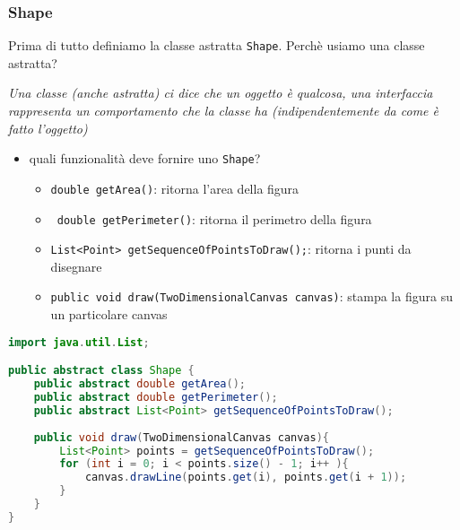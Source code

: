\documentclass{article}
\begin{document}
\subsubsection{Shape}
Prima di tutto definiamo la classe astratta \texttt{Shape}. 
Perch\`e usiamo una classe astratta?

\emph{Una classe (anche astratta) ci dice che un oggetto \`e qualcosa, una interfaccia rappresenta un comportamento che la classe ha (indipendentemente da come \`e fatto l’oggetto)}

\begin{itemize}
\item quali funzionalit\`a deve fornire uno \texttt{Shape}?
\begin{itemize}
\item \texttt{double getArea()}: ritorna l'area della figura
\item \texttt{ double getPerimeter()}: ritorna il perimetro della figura
\item \texttt{List<Point> getSequenceOfPointsToDraw();}: ritorna i punti da disegnare
\item \texttt{public void draw(TwoDimensionalCanvas canvas)}: stampa la figura su un particolare canvas
\end{itemize}
\end{itemize}
\begin{lstlisting}[language=Java,escapechar=|]
import java.util.List;

public abstract class Shape {
	public abstract double getArea();
	public abstract double getPerimeter();
	public abstract List<Point> getSequenceOfPointsToDraw();
	
	public void draw(TwoDimensionalCanvas canvas){
		List<Point> points = getSequenceOfPointsToDraw();
		for (int i = 0; i < points.size() - 1; i++ ){
			canvas.drawLine(points.get(i), points.get(i + 1));
		}
	}
}
\end{lstlisting}
\end{document}

